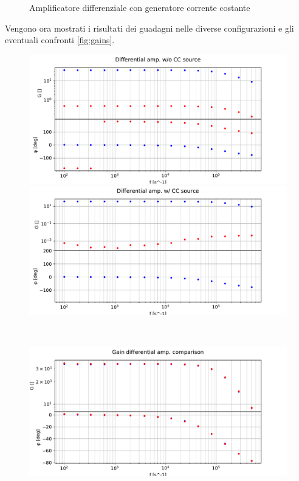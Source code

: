 \begin{figure}[h]
\begin{minipage}{0.49\textwidth}
        \caption{Amplificatore differenziale con gene\-ratore corrente costante}
        \label{fig:ampdiff_cc_circ}
    \end{minipage}
\end{figure}

Vengono ora mostrati i risultati dei guadagni nelle diverse configurazioni e gli eventuali confronti \ref{fig:gains}.

\begin{figure}[H]
    \centering
    \begin{minipage}{0.5\textwidth}
        \centering
        \includegraphics[width=\textwidth]{Figure_1.pdf} 
    \end{minipage}\hfill
    \begin{minipage}{0.5\textwidth}
        \centering
        \includegraphics[width=\textwidth]{Figure_2.pdf} 
    \end{minipage}
    \\
    \centering
    \begin{minipage}{0.5\textwidth}
        \centering
        \includegraphics[width=\textwidth]{Figure_3.pdf} 

\end{minipage}
\end{figure}
